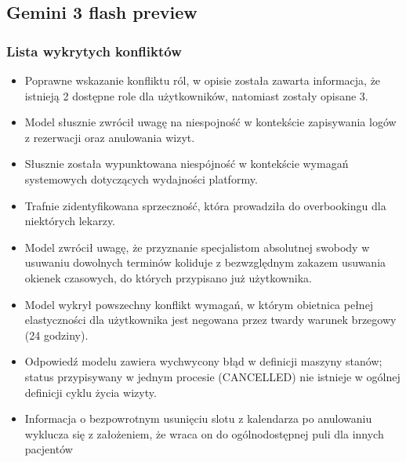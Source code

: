 \documentclass[12pt,a4paper]{article}
\begin{document}
\subsection{\textcolor{geminicolor}{Gemini 3 flash preview} }

\subsubsection{Lista wykrytych konfliktów}
\begin{itemize}
    \item[-] Poprawne wskazanie konfliktu ról, w opisie została zawarta informacja, że istnieją 2 dostępne role dla użytkowników, natomiast zostały opisane 3.

    \item[-] Model słusznie zwrócił uwagę na niespojność w kontekście zapisywania logów z rezerwacji oraz anulowania wizyt.

    \item[-] Słusznie została wypunktowana niespójność w kontekście wymagań systemowych dotyczących wydajności platformy.
    
    \item[-] Trafnie zidentyfikowana sprzeczność, która prowadziła do overbookingu dla niektórych lekarzy.
    
    \item[-] Model zwrócił uwagę, że przyznanie specjalistom absolutnej swobody w usuwaniu dowolnych terminów koliduje z bezwzględnym zakazem usuwania okienek czasowych, do których przypisano już użytkownika. 
    
    \item[-] Model wykrył powszechny konflikt wymagań, w którym obietnica pełnej elastyczności dla użytkownika jest negowana przez twardy warunek brzegowy (24 godziny).

    \item[-] Odpowiedź modelu zawiera wychwycony błąd w definicji maszyny stanów; status przypisywany w jednym procesie (CANCELLED) nie istnieje w ogólnej definicji cyklu życia wizyty.
    
    \item[-] Informacja o bezpowrotnym usunięciu slotu z kalendarza po anulowaniu wyklucza się z założeniem, że wraca on do ogólnodostępnej puli dla innych pacjentów
    
\end{itemize}
\end{document}
